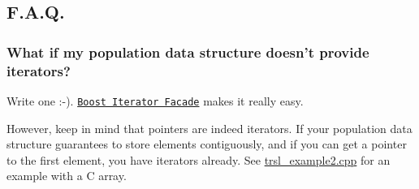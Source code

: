 \hypertarget{group__faq}{
\subsection{F.A.Q.}
\label{group__faq}
}
\hypertarget{group__faq_faq_no_population_iterator}{}\subsubsection{What if my population data structure doesn't provide iterators?}\label{group__faq_faq_no_population_iterator}
Write one :-\/). \href{http://www.boost.org/libs/iterator/doc/iterator_facade.html}{\tt Boost Iterator Facade} makes it really easy.

However, keep in mind that pointers are indeed iterators. If your population data structure guarantees to store elements contiguously, and if you can get a pointer to the first element, you have iterators already. See \hyperlink{trsl__example2_8cpp-example}{trsl\_\-example2.cpp} for an example with a C array. 